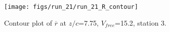 \begin{figure}[H]
\centering
\texttt{[image: figs/run\_21/run\_21\_R\_contour]}
\caption{Contour plot of $\overline{r}$ at $z/c$=7.75, $V_{free}$=15.2, station 3.}
\label{fig:run_21_R_contour}
\end{figure}


